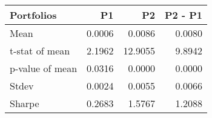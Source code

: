 \begin{tabular}{lrrr}
\toprule
Portfolios & P1 & P2 & P2 - P1 \\
\midrule
Mean & 0.0006 & 0.0086 & 0.0080 \\
t-stat of mean & 2.1962 & 12.9055 & 9.8942 \\
p-value of mean & 0.0316 & 0.0000 & 0.0000 \\
Stdev & 0.0024 & 0.0055 & 0.0066 \\
Sharpe & 0.2683 & 1.5767 & 1.2088 \\
\bottomrule
\end{tabular}
